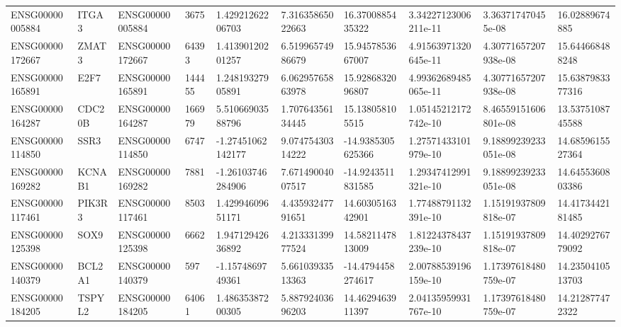\begin{tabular}{@{}llllllllll@{}}
ENSG00000005884 & ITGA3 & ENSG00000005884 & 3675 & 1.42921262206703 & 7.31635865022663 & 16.3700885435322 & 3.34227123006211e-11 & 3.363717470455e-08 & 16.02889674885 \\
ENSG00000172667 & ZMAT3 & ENSG00000172667 & 64393 & 1.41390120201257 & 6.51996574986679 & 15.9457853667007 & 4.91563971320645e-11 & 4.30771657207938e-08 & 15.644668488248 \\
ENSG00000165891 & E2F7 & ENSG00000165891 & 144455 & 1.24819327905891 & 6.06295765863978 & 15.9286832096807 & 4.99362689485065e-11 & 4.30771657207938e-08 & 15.6387983377316 \\
ENSG00000164287 & CDC20B & ENSG00000164287 & 166979 & 5.51066903588796 & 1.70764356134445 & 15.138058105515 & 1.05145212172742e-10 & 8.46559151606801e-08 & 13.5375108745588 \\
ENSG00000114850 & SSR3 & ENSG00000114850 & 6747 & -1.27451062142177 & 9.07475430314222 & -14.9385305625366 & 1.27571433101979e-10 & 9.18899239233051e-08 & 14.6859615527364 \\
ENSG00000169282 & KCNAB1 & ENSG00000169282 & 7881 & -1.26103746284906 & 7.67149004007517 & -14.9243511831585 & 1.29347412991321e-10 & 9.18899239233051e-08 & 14.6455360803386 \\
ENSG00000117461 & PIK3R3 & ENSG00000117461 & 8503 & 1.42994609651171 & 4.43593247791651 & 14.6030516342901 & 1.77488791132391e-10 & 1.15191937809818e-07 & 14.4173442181485 \\
ENSG00000125398 & SOX9 & ENSG00000125398 & 6662 & 1.94712942636892 & 4.21333139977524 & 14.5821147813009 & 1.81224378437239e-10 & 1.15191937809818e-07 & 14.4029276779092 \\
ENSG00000140379 & BCL2A1 & ENSG00000140379 & 597 & -1.1574869749361 & 5.66103933513363 & -14.4794458274617 & 2.00788539196159e-10 & 1.17397618480759e-07 & 14.2350410513703 \\
ENSG00000184205 & TSPYL2 & ENSG00000184205 & 64061 & 1.48635387200305 & 5.88792403696203 & 14.4629463911397 & 2.04135959931767e-10 & 1.17397618480759e-07 & 14.212877472322 \\
\bottomrule
\end{tabular}
\endgroup
